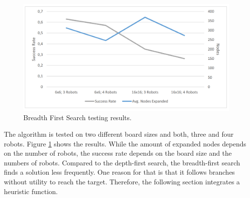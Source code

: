 \documentclass[a4paper,10pt]{article}
\begin{document}
	  \begin{figure}
	  	\centering
	  	\includegraphics[scale=0.47]{figures/Bfs_test_results.PNG}
	  	\caption{Breadth First Search testing results.}
	  	\label{fig:bfs_test}
	  \end{figure}
  The algorithm is tested on two different board sizes and both, three and four robots. Figure \ref{fig:bfs_test} shows the results. While the amount of expanded nodes depends on the number of robots, the success rate depends on the board size and the numbers of robots. Compared to the depth-first search, the breadth-first search finds a solution less frequently. One reason for that is that it follows branches without utility to reach the target. Therefore, the following section integrates a heuristic function.
\end{document}
